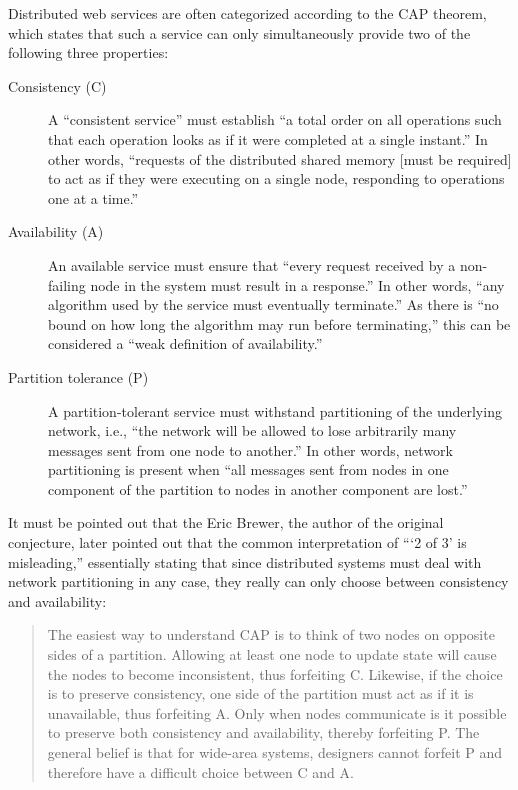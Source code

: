 Distributed web services are often categorized according to the CAP theorem, which states that such a service can only simultaneously provide two of the following three properties: \autocite{gilbert2002}

\begin{description}
	\item[Consistency (C)]
		A ``consistent service'' must establish ``a total order on all operations such that each operation looks as if it were completed at a single instant.''
		In other words, ``requests of the distributed shared memory [must be required] to act as if they were executing on a single node, responding to operations one at a time.''
	\item[Availability (A)]
		An available service must ensure that ``every request received by a non-failing node in the system must result in a response.''
		In other words, ``any algorithm used by the service must eventually terminate.''
		As there is ``no bound on how long the algorithm may run before terminating,'' this can be considered a ``weak definition of availability.''
	\item[Partition tolerance (P)]
		A partition-tolerant service must withstand partitioning of the underlying network, i.e., ``the network will be allowed to lose arbitrarily many messages sent from one node to another.''
		In other words, network partitioning is present when ``all messages sent from nodes in one component of the partition to nodes in another component are lost.''
\end{description}

It must be pointed out that the Eric Brewer, the author of the original conjecture, later pointed out that the common interpretation of \enquote{\enquote{2 of 3} is misleading,} essentially stating that since distributed systems must deal with network partitioning in any case, they really can only choose between consistency and availability: \autocite{infoq2012caplater}

\begin{quote}
	The easiest way to understand CAP is to think of two nodes on opposite sides of a partition. Allowing at least one node to update state will cause the nodes to become inconsistent, thus forfeiting C.
	Likewise, if the choice is to preserve consistency, one side of the partition must act as if it is unavailable, thus forfeiting A.
	Only when nodes communicate is it possible to preserve both consistency and availability, thereby forfeiting P.
	The general belief is that for wide-area systems, designers cannot forfeit P and therefore have a difficult choice between C and A.
\end{quote}

